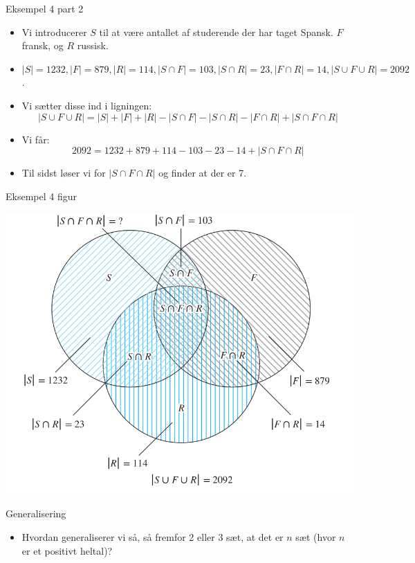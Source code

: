 \documentclass{beamer}
\begin{document}
\begin{frame}{Eksempel 4 part 2}

    \begin{itemize}
       \item<1-> Vi introducerer $S$ til at være antallet af studerende der har taget Spansk. $F$ fransk, og $R$ russisk. 
       \item<1-> $|S| = 1232, |F| = 879, |R| = 114, |S \cap F| = 103, |S \cap R| = 23, |F \cap R| = 14, |S \cup F \cup R| = 2092$.
       \item<2-> Vi sætter disse ind i ligningen: $$|S \cup F \cup R| = |S| + |F| + |R| - |S \cap F| - |S \cap R| - |F \cap R| + |S \cap F \cap R|$$
       \item<3-> Vi får: $$2092 = 1232 + 879 + 114 - 103 - 23 - 14 + |S \cap F \cap R|$$
       \item<4-> Til sidst løser vi for $|S \cap F \cap R| $ og finder at der er 7.
    \end{itemize}
\end{frame}

\begin{frame}{Eksempel 4 figur}
\begin{center}
    \includegraphics[scale=0.4]{81fig4.png}
\end{center}
\end{frame}

\begin{frame}{Generalisering}
   \begin{itemize}
       \item Hvordan generaliserer vi så, så fremfor 2 eller 3 sæt, at det er $n$ sæt (hvor $n$ er et positivt heltal)? 
   \end{itemize} 
\end{frame}
\end{document}
